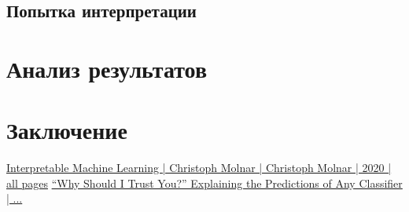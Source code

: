 \documentclass[a4paper, 12pt]{article}
\begin{document}
	\subsection{Попытка интерпретации}
	
	\newpage
	
	\section{Анализ результатов}
	
	\newpage
	
	\section{Заключение}
	
	\newpage
	
	\begin{thebibliography}{99}
		\href{https://christophm.github.io/interpretable-ml-book/}{Interpretable Machine Learning | Christoph Molnar | Christoph Molnar | 2020 | all pages}
		\href{https://arxiv.org/pdf/1602.04938.pdf}{“Why Should I Trust You?” Explaining the Predictions of Any Classifier
| ...}
	\end{thebibliography}
\end{document}
